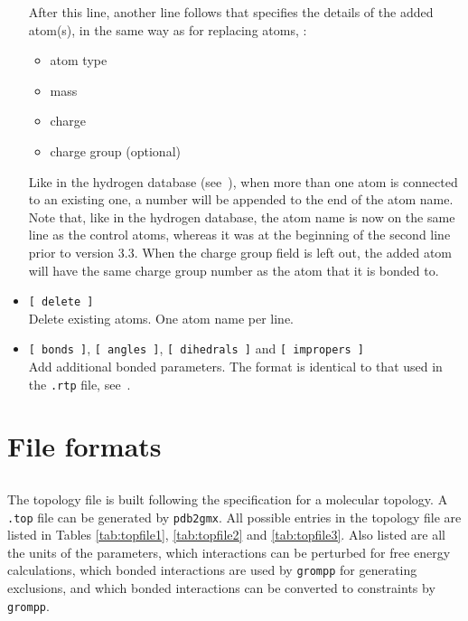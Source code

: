 \begin{itemize}
After this line, another line follows that specifies the details of
the added atom(s), in the same way as for replacing atoms, {\ie}: 
\begin{itemize}
\item atom type
\item mass
\item charge
\item charge group (optional)
\end{itemize}
Like in the hydrogen database (see~), when more than
one atom is connected to an existing one, a number will be appended to
the end of the atom name. Note that, like in the hydrogen database, the
atom name is now on the same line as the control atoms, whereas it was
at the beginning of the second line prior to {\gromacs} version 3.3.
When the charge group field is left out, the added atom will have
the same charge group number as the atom that it is bonded to.
\item {\tt [~delete~]}\\
Delete existing atoms. One atom name per line.
\item {\tt [~bonds~]}, {\tt [~angles~]}, {\tt [~dihedrals~]} and {\tt [~impropers~]}\\
Add additional bonded parameters. The format is identical to that used
in the {\tt *.rtp} file, see~.
\end{itemize}

\section{File formats}
\subsection{}
\label{subsec:topfile}
The topology file is built following the {\gromacs} specification for a
molecular topology.  A {\tt *.top} file can be generated by
{\tt pdb2gmx}.
All possible entries in the topology file are listed in
Tables \ref{tab:topfile1}, \ref{tab:topfile2}  and \ref{tab:topfile3}.
Also listed are all the units
of the parameters, which interactions can be perturbed for free energy
calculations, which bonded interactions are used by {\tt grompp}
for generating exclusions, and which bonded interactions can be converted
to constraints by {\tt grompp}.


\newcommand{\tts}{\tt \small}

